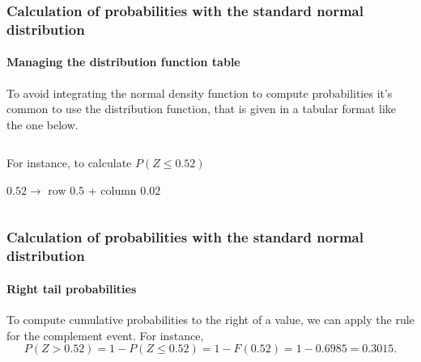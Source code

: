 \begin{frame}
\frametitle{Calculation of probabilities with the standard normal distribution}
\framesubtitle{Managing the distribution function table}
To avoid integrating the normal density function to compute probabilities it's common to use the distribution function,
that is given in a tabular format like the one below.

\begin{columns}
\begin{column}{0.47\textwidth}
\begin{center}
For instance, to calculate $P(Z\leq 0.52)$


$0.52 \rightarrow $ row $0.5$ + column $0.02$
\end{center}
\end{column}
\begin{column}{0.53\textwidth}
\begin{center}
\end{center}
\end{column}
\end{columns}
\end{frame}


\begin{frame}
\frametitle{Calculation of probabilities with the standard normal distribution}
\framesubtitle{Right tail probabilities}
To compute cumulative probabilities to the right of a value, we can apply the rule for the complement event.
For instance, 
\[
P(Z>0.52) =1-P(Z\leq 0.52) = 1-F(0.52) = 1 - 0.6985 = 0.3015.
\]
\begin{center}
\end{center}
\end{frame}


